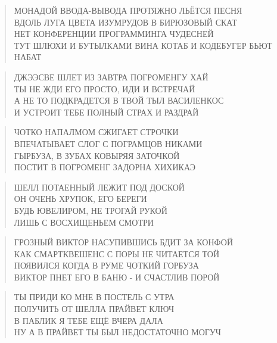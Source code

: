 \poemtitle{***}
\begin{verse}
МОНАДОЙ ВВОДА-ВЫВОДА ПРОТЯЖНО ЛЬЁТСЯ ПЕСНЯ\\
ВДОЛЬ ЛУГА ЦВЕТА ИЗУМРУДОВ В БИРЮЗОВЫЙ СКАТ\\
НЕТ КОНФЕРЕНЦИИ ПРОГРАММИНГА ЧУДЕСНЕЙ\\
ТУТ ШЛЮХИ И БУТЫЛКАМИ ВИНА КОТАБ И КОДЕБУГЕР БЬЮТ НАБАТ
\end{verse}

\poemtitle{***}
\begin{verse}
ДЖЭЭСВЕ ШЛЕТ ИЗ ЗАВТРА ПОГРОМЕНГУ ХАЙ\\
ТЫ НЕ ЖДИ ЕГО ПРОСТО, ИДИ И ВСТРЕЧАЙ\\
А НЕ ТО ПОДКРАДЕТСЯ В ТВОЙ ТЫЛ ВАСИЛЕНКОС\\
И УСТРОИТ ТЕБЕ ПОЛНЫЙ СТРАХ И РАЗДРАЙ
\end{verse}

\poemtitle{***}
\begin{verse}
ЧОТКО НАПАЛМОМ СЖИГАЕТ СТРОЧКИ\\
ВПЕЧАТЫВАЕТ СЛОГ С ПОГРАМЦОВ НИКАМИ\\
ГЫРБУЗА, В ЗУБАХ КОВЫРЯЯ ЗАТОЧКОЙ\\
ПОСТИТ В ПОГРОМЕНГ ЗАДОРНА ХИХИКАЭ
\end{verse}

\poemtitle{***}
\begin{verse}
ШЕЛЛ ПОТАЕННЫЙ ЛЕЖИТ ПОД ДОСКОЙ\\
ОН ОЧЕНЬ ХРУПОК, ЕГО БЕРЕГИ\\
БУДЬ ЮВЕЛИРОМ, НЕ ТРОГАЙ РУКОЙ\\
ЛИШЬ С ВОСХИЩЕНЬЕМ СМОТРИ
\end{verse}

\poemtitle{***}
\begin{verse}
ГРОЗНЫЙ ВИКТОР НАСУПИВШИСЬ БДИТ ЗА КОНФОЙ\\
КАК СМАРТКВЕШЕНС С ПОРЫ НЕ ЧИТАЕТСЯ ТОЙ\\
ПОЯВИЛСЯ КОГДА В РУМЕ ЧОТКИЙ ГОРБУЗА\\
ВИКТОР ПНЕТ ЕГО В БАНЮ - И СЧАСТЛИВ ПОРОЙ
\end{verse}

\poemtitle{***}
\begin{verse}
ТЫ ПРИДИ КО МНЕ В ПОСТЕЛЬ С УТРА\\
ПОЛУЧИТЬ ОТ ШЕЛЛА  ПРАЙВЕТ КЛЮЧ\\
В ПАБЛИК Я ТЕБЕ ЕЩЁ ВЧЕРА ДАЛА\\
НУ А В ПРАЙВЕТ ТЫ БЫЛ НЕДОСТАТОЧНО МОГУЧ
\end{verse}

